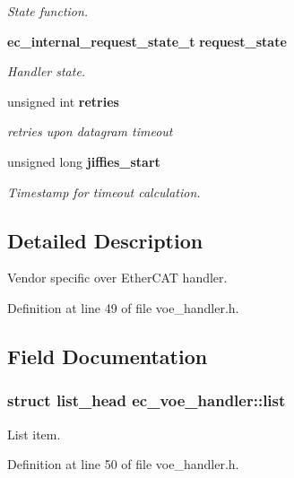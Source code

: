 \begin{DoxyCompactItemize}
\begin{DoxyCompactList}\small\item\em State function. \end{DoxyCompactList}\item 
{\bf ec\-\_\-internal\-\_\-request\-\_\-state\-\_\-t} {\bf request\-\_\-state}
\begin{DoxyCompactList}\small\item\em Handler state. \end{DoxyCompactList}\item 
unsigned int {\bf retries}\label{structec__voe__handler_a94b591afc9239d7da95ce47108211048}

\begin{DoxyCompactList}\small\item\em retries upon datagram timeout \end{DoxyCompactList}\item 
unsigned long {\bf jiffies\-\_\-start}
\begin{DoxyCompactList}\small\item\em Timestamp for timeout calculation. \end{DoxyCompactList}\end{DoxyCompactItemize}


\subsection{Detailed Description}
Vendor specific over Ether\-C\-A\-T handler. 

Definition at line 49 of file voe\-\_\-handler.\-h.



\subsection{Field Documentation}
\subsubsection[{list}]{\setlength{\rightskip}{0pt plus 5cm}struct list\-\_\-head ec\-\_\-voe\-\_\-handler\-::list}\label{structec__voe__handler_ab078e6fbc73c7bb4f7cb465b6c4abfa3}


List item. 



Definition at line 50 of file voe\-\_\-handler.\-h.

